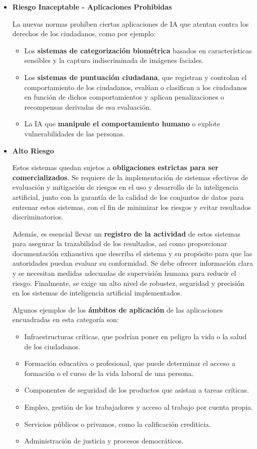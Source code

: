 \begin{itemize}
	\item \textbf{Riesgo Inaceptable - Aplicaciones Prohibidas}
	
	La nuevas normas prohíben ciertas aplicaciones de IA que atentan contra los derechos de los ciudadanos, como por ejemplo:
	\begin{itemize}
		\item Los \textbf{sistemas de categorización biométrica} basados en características sensibles y la captura indiscriminada de imágenes faciales.
		\item Los \textbf{sistemas de puntuación ciudadana}, que registran y controlan el comportamiento de los ciudadanos, evalúan o clasifican a los ciudadanos en función de dichos comportamientos y aplican penalizaciones o recompensas derivadas de esa evaluación.
		\item La IA que \textbf{manipule el comportamiento humano} o explote vulnerabilidades de las personas.
	\end{itemize}
	
	
	\item \textbf{Alto Riesgo}
	
	Estos sistemas quedan sujetos a \textbf{obligaciones estrictas para ser comercializados}. Se requiere de la implementación de sistemas efectivos de evaluación y mitigación de riesgos en el uso y desarrollo de la inteligencia artificial, junto con la garantía de la calidad de los conjuntos de datos para entrenar estos sistemas, con el fin de minimizar los riesgos y evitar resultados discriminatorios. 
	
	Además, es esencial llevar un \textbf{registro de la actividad} de estos sistemas para asegurar la trazabilidad de los resultados, así como proporcionar documentación exhaustiva que describa el sistema y su propósito para que las autoridades puedan evaluar su conformidad. Se debe ofrecer información clara y se necesitan medidas adecuadas de supervisión humana para reducir el riesgo. Finalmente, se exige un alto nivel de robustez, seguridad y precisión en los sistemas de inteligencia artificial implementados.
	
	Algunos ejemplos de los \textbf{ámbitos de aplicación} de las aplicaciones encuadradas en esta categoría son:
	\begin{itemize}
		\item Infraestructuras críticas, que podrían poner en peligro la vida o la salud de los ciudadanos.
		\item Formación educativa o profesional, que puede determinar el acceso a formación o el curso de la vida laboral de una persona.
		\item Componentes de seguridad de los productos que asistan a tareas críticas.
		\item Empleo, gestión de los trabajadores y acceso al trabajo por cuenta propia.
		\item Servicios públicos o privamos, como la calificación crediticia.
		\item Administración de justicia y procesos democráticos.
	\end{itemize}
	

\end{itemize}
